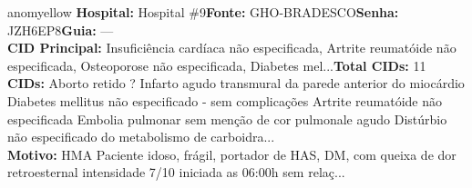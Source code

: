 \documentclass[a4paper,10pt]{article}
\begin{document}
\begin{anomalycard}[Interna\c{c}\~{a}o \#118341 | Pac. \#98193 | MODERADO (z=2.02) | LOS: 9d | 21/02/2026\,$\to$\,02/03/2026]{anomyellow}
\textbf{Hospital:} Hospital \#9\quad \textbf{Fonte:} GHO-BRADESCO\quad \textbf{Senha:} JZH6EP8\quad \textbf{Guia:} ---\\

\textbf{CID Principal:} {\small Insuficiência cardíaca não especificada, Artrite reumatóide não especificada, Osteoporose não especificada, Diabetes mel...}\quad\textbf{Total CIDs:} 11\\

\textbf{CIDs:} {\scriptsize Aborto retido \textbar{} ? \textbar{} Infarto agudo transmural da parede anterior do miocárdio \textbar{} Diabetes mellitus não especificado - sem complicações \textbar{} Artrite reumatóide não especificada \textbar{} Embolia pulmonar sem menção de cor pulmonale agudo \textbar{} Distúrbio não especificado do metabolismo de carboidra...}\\

\textbf{Motivo:} {\scriptsize HMA   Paciente idoso, frágil, portador de HAS, DM, com queixa de dor retroesternal intensidade 7/10 iniciada as 06:00h sem relaç...}\\




\end{anomalycard}
\end{document}
